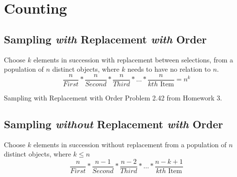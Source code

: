 \section{Counting} \label{sec:Counting}
	\subsection{Sampling \emph{with} Replacement \emph{with} Order} \label{subsec:Ordered Sampling with Replacement}
		\begin{definition} \label{def:Ordered Sampling with Replacement}
			Choose $k$ elements in succession with replacement between selections, from a population of $n$ distinct objects, where $k$ needs to have no relation to $n$.
			\begin{equation} \label{eq:Ordered Sampling with Replacement}
				\frac{n}{First} * \frac{n}{Second} * \frac{n}{Third} * \ldots * \frac{n}{kth \text{ Item}} = n^{k}
			\end{equation}
		\end{definition}
		\begin{example}[Problem 2.42]{Sampling with Replacement with Order}
			Problem 2.42 from Homework 3.
		\end{example}
	
	\subsection{Sampling \emph{without} Replacement \emph{with} Order} \label{subsec:Ordered Sampling without Replacement}
		\begin{definition} \label{def:Ordered Sampling without Replacement}
			Choose $k$ elements in succession without replacement from a population of $n$ distinct objects, where $k \leq n$
			\begin{equation} \label{eq:Ordered Sampling without Replacement}
				\frac{n}{First} * \frac{n-1}{Second} * \frac{n-2}{Third} * \ldots * \frac{n-k+1}{kth \text{ Item}}
			\end{equation}
		\end{definition}
		
